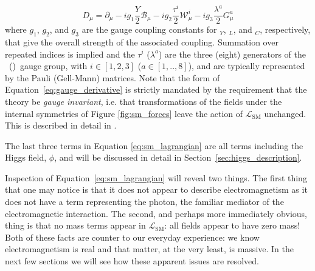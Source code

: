 \begin{equation}
	\mathit{D}_{\mu} = \partial_{\mu} - i g_1 \frac{Y}{2} \mathcal{B}_{\mu} - i g_2 \frac{\tau^i}{2} \mathcal{W}_{\mu}^i - i g_3 \frac{\lambda^a}{2} G_{\mu}^a
	\label{eq:gauge_derivative}
\end{equation}
where $g_1$, $g_2$, and $g_3$ are the gauge coupling constants for \Uone$_{Y}$, \SUtwo$_{L}$, and \SUthree$_{C}$, respectively, that give the overall strength of the associated coupling.
Summation over repeated indices is implied and the $\tau^i$ ($\lambda^a$) are the three (eight)
generators of the \SUtwo~(\SUthree)~gauge group, with $i \in [1,2,3]$ ($a \in [1,..,8]$), and
are typically represented by the Pauli (Gell-Mann) matrices. Note that the form of Equation~\ref{eq:gauge_derivative} is strictly mandated by the requirement that the theory
be \textit{gauge invariant}, i.e. that transformations of the fields under the internal symmetries
of Figure \ref{fig:sm_forces} leave the action of $\mathcal{L}_{\text{SM}}$ unchanged. This is described in detail
in {\color{red}{Appendix XXX}}.

The last three terms in Equation \ref{eq:sm_lagrangian} are all terms including the Higgs field, $\phi$,
and will be discussed in detail in Section~\ref{sec:higgs_description}.

Inspection of Equation~\ref{eq:sm_lagrangian} will reveal two things. The first thing that one
may notice is that it does not appear to describe electromagnetism as it does not have a
term representing the photon, the familiar mediator of the electromagnetic interaction.
The second, and perhaps more immediately obvious, thing is that no mass terms
appear in $\mathcal{L}_{\text{SM}}$: all fields appear to have zero mass! Both of these
facts are counter to our everyday experience: we know electromagnetism is real and that matter,
at the very least, is massive. In the next few sections we will see how these apparent
issues are resolved.


\FloatBarrier



